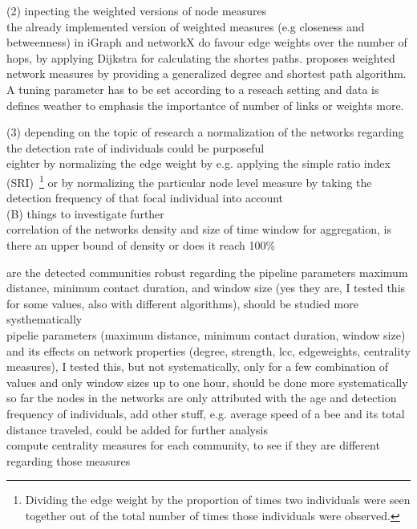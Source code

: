 (2) inpecting the weighted versions of node measures\\
the already implemented version of weighted measures (e.g closeness and betweenness) in iGraph and networkX do favour edge weights over the number of hops, by applying Dijkstra for calculating the shortes paths. \textcite{opsahl2010node} proposes weighted network measures by providing a generalized degree and shortest path algorithm. A tuning parameter has to be set according to a reseach setting and data is defines weather to emphasis the importantce of number of links or weights more.

(3) depending on the topic of research a normalization of the networks regarding the detection rate of individuals could be purposeful\\
eighter by normalizing the edge weight by e.g. applying the simple ratio index (SRI)~\footnote{Dividing the edge weight by the proportion of times two individuals were seen
together out of the total number of times those individuals were observed.} 
or by normalizing the particular node level measure by taking the detection frequency of that focal individual into account\\


(B) things to investigate further\\

correlation of the networks density and size of time window for aggregation, is there an upper bound of density or does it reach 100\%

are the detected communities robust regarding the pipeline parameters maximum distance, minimum contact duration, and window size (yes they are, I tested this for some values, also with different algorithms), should be studied more systhematically\\

pipelie parameters (maximum distance, minimum contact duration, window size) and its effects on network properties (degree, strength, lcc, edgeweights, centrality measures), I tested this, but not systematically, only for a few combination of values and only window sizes up to one hour, should be done more systematically\\

so far the nodes in the networks are only attributed with the age and detection frequency of individuals, add other stuff, e.g. average speed of a bee and its total distance traveled, could be added for further analysis\\

compute centrality measures for each community, to see if they are different regarding those measures\\


